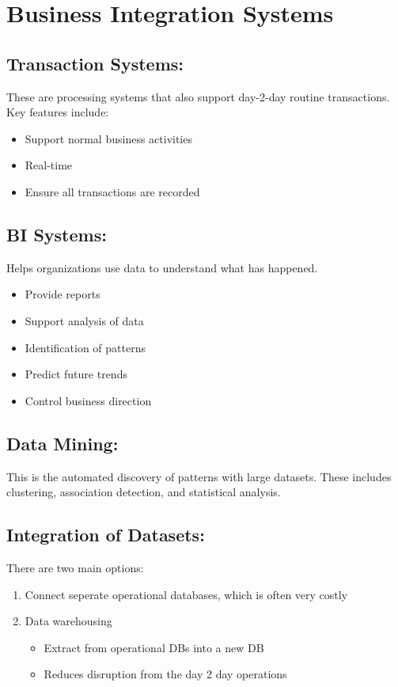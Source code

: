 \documentclass[a5paper]{article}
\begin{document}
	\section{Business Integration Systems}
	\subsection{Transaction Systems:}
	These are processing systems that also support day-2-day routine transactions. Key features include:
	\begin{itemize}
		\item Support normal business activities
		\item Real-time
		\item Ensure all transactions are recorded
	\end{itemize}
	\subsection{BI Systems:}
	Helps organizations use data to understand what has happened.
	\begin{itemize}
		\item Provide reports
		\item Support analysis of data
		\item Identification of patterns
		\item Predict future trends
		\item Control business direction
	\end{itemize}
	\subsection{Data Mining:}
	This is the automated discovery of patterns with large datasets. These includes clustering, association detection, and statistical analysis.
	\subsection{Integration of Datasets:}
	There are two main options:
	\begin{enumerate}
		\item Connect seperate operational databases, which is often very costly
		\item Data warehousing
			\begin{itemize}
				\item Extract from operational DBs into a new DB
				\item Reduces disruption from the day 2 day operations
			\end{itemize}
	\end{enumerate}
\end{document}
